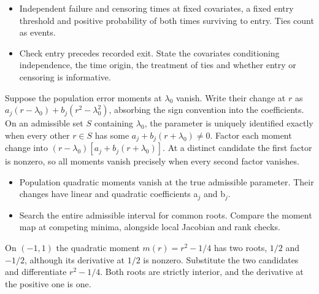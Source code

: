 \expandafter\def\csname statadic@assumptions@STATADIC-SURVIVAL-003\endcsname{\begin{itemize}
\item Independent failure and censoring times at fixed covariates, a fixed entry threshold and positive probability of both times surviving to entry. Ties count as events.
\end{itemize}}
\expandafter\def\csname statadic@diagnostics@STATADIC-SURVIVAL-003\endcsname{\begin{itemize}
\item Check entry precedes recorded exit. State the covariates conditioning independence, the time origin, the treatment of ties and whether entry or censoring is informative.
\end{itemize}}
\expandafter\def\csname statadic@statement@STATADIC-SPATIAL-004\endcsname{Suppose the population error moments at $\lambda_0$ vanish.
  Write their change at $r$ as $a_j(r-\lambda_0)+b_j(r^2-\lambda_0^2)$,
  absorbing the sign convention into the coefficients. On an admissible
  set $S$ containing $\lambda_0$, the parameter is uniquely identified exactly
  when every other $r\in S$ has some $a_j+b_j(r+\lambda_0)\ne0$.}
\expandafter\def\csname statadic@proof@STATADIC-SPATIAL-004\endcsname{Factor each moment change into
  $(r-\lambda_0)[a_j+b_j(r+\lambda_0)]$. At a distinct candidate the
  first factor is nonzero, so all moments vanish precisely when every second
  factor vanishes.}
\expandafter\def\csname statadic@assumptions@STATADIC-SPATIAL-004\endcsname{\begin{itemize}
\item Population quadratic moments vanish at the true admissible parameter. Their changes have linear and quadratic coefficients a\ensuremath{{}_j} and b\ensuremath{{}_j}.
\end{itemize}}
\expandafter\def\csname statadic@diagnostics@STATADIC-SPATIAL-004\endcsname{\begin{itemize}
\item Search the entire admissible interval for common roots. Compare the moment map at competing minima, alongside local Jacobian and rank checks.
\end{itemize}}
\expandafter\def\csname statadic@statement@STATADIC-SPATIAL-005\endcsname{On $(-1,1)$ the quadratic moment $m(r)=r^2-1/4$
  has two roots, $1/2$ and $-1/2$, although its derivative at $1/2$ is nonzero.}
\expandafter\def\csname statadic@proof@STATADIC-SPATIAL-005\endcsname{Substitute the two candidates and differentiate $r^2-1/4$.
  Both roots are strictly interior, and the derivative at the positive one is one.}
